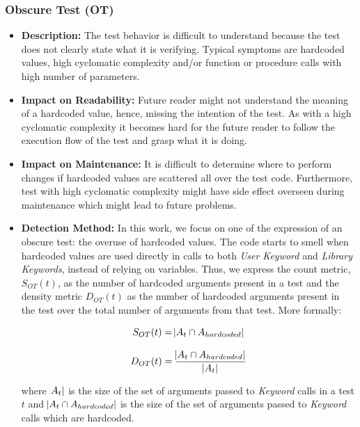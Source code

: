 \subsubsection{Obscure Test (OT)}

\begin{itemize}
    \item \textbf{Description:} The test behavior is difficult to understand because the test does not clearly state what it is verifying. Typical symptoms are hardcoded values, high cyclomatic complexity and/or function or procedure calls with high number of parameters.

    \item \textbf{Impact on Readability:} Future reader might not understand the meaning of a hardcoded value, hence, missing the intention of the test. As with a high cyclomatic complexity it becomes hard for the future reader to follow the execution flow of the test and grasp what it is doing.
    
    \item \textbf{Impact on Maintenance:} It is difficult to determine where to perform changes if hardcoded values are scattered all over the test code. Furthermore, test with high cyclomatic complexity might have side effect overseen during maintenance which might lead to future problems.
    
    \item \textbf{Detection Method:} In this work, we focus on one of the expression of an obscure test: the overuse of hardcoded values. The code starts to smell when hardcoded values are used directly in calls to both \emph{User Keyword} and \emph{Library Keywords}, instead of relying on variables. Thus, we express the count metric, $S_{OT}(t)$, as the number of hardcoded arguments present in a test and the density metric $D_{OT}(t)$ as the number of hardcoded arguments present in the test over the total number of arguments from that test. More formally:
    
    \begin{equation*}
        S_{OT}(t) = \abs{A_{t} \cap A_{hardcoded}}
    \end{equation*}
    
    \begin{equation*}
        D_{OT}(t) = \frac{\abs{A_{t} \cap A_{hardcoded}}}{\abs{A_t}}
    \end{equation*}
    
    where $\abs{A_t}$ is the size of the set of arguments passed to \emph{Keyword} calls in a test $t$ and $\abs{A_{t} \cap A_{hardcoded}}$ is the size of the set of arguments passed to \emph{Keyword} calls which are hardcoded.
    

\end{itemize}
